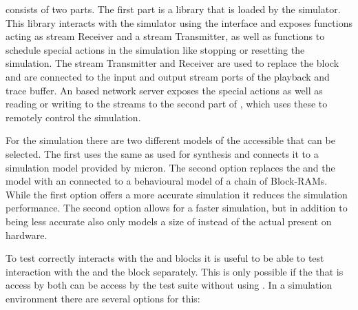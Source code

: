 \flange{} consists of two parts. The first part is a library that is loaded by the simulator. This library interacts with the simulator using the \DPI{} interface and exposes functions acting as stream Receiver and a stream Transmitter, as well as functions to schedule special actions in the simulation like stopping or resetting the simulation. The stream Transmitter and Receiver are used to replace the \HostARQ{} block and are connected to the input and output stream ports of the playback and trace buffer. An \RCF{}\autocite{ref:rcf} based network server exposes the special actions as well as reading or writing to the streams to the second part of \flange{}, which uses these to remotely control the simulation.

For the simulation there are two different models of the \AXI{} accessible \DRAM{} that can be selected. The first uses the same \MIG{} as used for synthesis and connects it to a \DDR{} simulation model provided by micron\autocite{ref:ddr3Model}. The second option replaces the \MIG{} and the \DDR{} model with an \AXIBRAMController{} connected to a behavioural model of a chain of Block-RAMs. While the first option offers a more accurate simulation it reduces the simulation performance. The second option allows for a faster simulation, but in addition to being less accurate also only models a size of \SIMMEMSIZE{} instead of the actual \DDRSIZE{} present on hardware.

To test \ayo{} correctly interacts with the \FAXI{} and \AXIDMA{} blocks it is useful to be able to test interaction with the \FAXI{} and the \AXIDMA{} block separately. This is only possible if the \DRAM{} that is access by both can be access by the test suite without using \FAXI{}. In a simulation environment there are several options for this:

